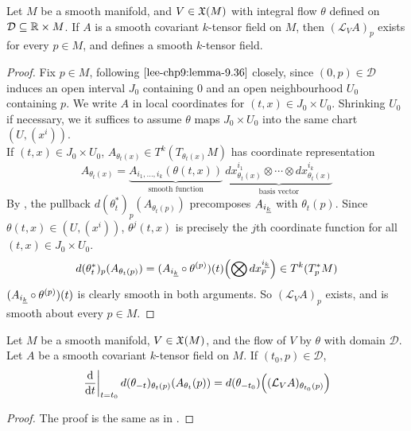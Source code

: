 \documentclass[../main-manifolds.tex]{subfiles}
\begin{document}
\begin{wts}
    Let $M$ be a smooth manifold, and $V\in \mathfrak{X}(M)$ with integral flow $\theta$ defined on $\mathcal{D}\subseteq\mathbb{R}\times M$. If $A$ is a smooth covariant $k$-tensor field on $M$, then $(\mathcal{L}_V A)_p$ exists for every $p\in M$, and defines a smooth $k$-tensor field.
\end{wts}
\begin{proof}
    Fix $p\in M$, following $\Cref{lee-chp9:lemma-9.36}$ closely, since $(0,p)\in\mathcal{D}$ induces an open interval $J_0$ containing $0$ and an open neighbourhood $U_0$ containing $p$. We write $A$ in local coordinates for $(t,x)\in J_0\times U_0$. Shrinking $U_0$ if necessary, we it suffices to assume $\theta$ maps $J_0\times U_0$ into the same chart $(U,(x^i))$.\\

    If $(t,x)\in J_0\times U_0$, $A_{\theta_t(x)}\in T^k(T_{\theta_t(x)}M)$ has coordinate representation
    \[
        A_{\theta_t(x)} = \underbrace{A_{i_1,\ldots, i_k}(\theta(t,x))}_{\text{smooth function}}\: \underbrace{dx^{i_1}_{\theta_t(x)}\otimes\cdots\otimes dx^{i_k}_{\theta_t(x)}}_{\text{basis vector}}
    \]
    By , the pullback $d(\theta^*_t)_{p}(A_{\theta_t(p)})$ precomposes $A_{\Ul{i}[k]}$ with $\theta_{t}(p)$. Since $\theta(t,x)\in (U,(x^i))$, $\theta^j(t,x)$ is precisely the $j$th coordinate function for all $(t,x)\in J_0\times U_0$.
    \[
        d(\theta^*_t)_{p}(A_{\theta_t(p)}) = (A_{\Ul{i}[k]}\circ \theta^{(p)}) (t)\qty(\bigotimes dx_{p}^{\Ul{i}[k]})\in T^k(T^*_pM)
    \]
    $(A_{\Ul{i}[k]}\circ \theta^{(p)}) (t)$ is clearly smooth in both arguments. So $(\mathcal{L}_V A)_p$ exists, and is smooth about every $p\in M$.
\end{proof}

\begin{wts}
    Let $M$ be a smooth manifold, $V\in\mathfrak{X}(M)$, and the flow of $V$ by $\theta$ with domain $\mathcal{D}$. Let $A$ be a smooth covariant $k$-tensor field on $M$. If $(t_0, p)\in \mathcal{D}$,
    \[
        \eval{\dv{t}}_{t=t_0} d(\theta_{-t})_{\theta_t(p)}(A_{\theta_t}(p)) = d(\theta_{-t_0})\qty((\mathcal{L}_V A)_{\theta_{t_0}(p)})
    \]
\end{wts}
\begin{proof}
    The proof is the same as in .
\end{proof}
\end{document}
